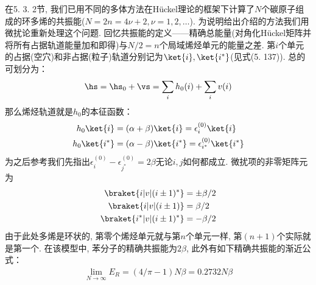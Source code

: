 在5.
3.
2节, 
我们已用不同的多体方法在H\"uckel理论的框架下计算了$N$个碳原子组成的环多烯的共振能($N=2n=4\nu +2,\nu=1,2,\ldots$). 
为说明给出介绍的方法我们用微扰论重新处理这个问题. 
回忆共振能的定义——精确总能量(对角化H\"uckel矩阵并将所有占据轨道能量加和即得)与$N/2=n$个局域烯烃单元的能量之差. 
第$i$个单元的占据(空穴)和非占据(粒子)轨道分别记为$\ket{i},\ket{i^*}$(见式(5.
137)). 
总的\ha 可划分为：
\begin{align}
\hs = \hs_0 + \vs = \sum_ih_0(i) + \sum_iv(i)
\end{align}
那么烯烃轨道就是$h_0$的本征函数：
\begin{subequations}
	\begin{align}
	h_0\ket{i} &= (\alpha+\beta)\ket{i} = \epsilon_i^{(0)}\ket{i}\\
	h_0\ket{i^*} &= (\alpha-\beta)\ket{i^*} = \epsilon_{i^*}^{(0)}\ket{i^*}
	\end{align}
\end{subequations}
为之后参考我们先指出$\epsilon_i^{(0)} - \epsilon^{(0)}_{j^*}=2\beta$无论$i,j$如何都成立. 
微扰项的非零矩阵元为
\begin{subequations}
	\begin{align}
	\braket{i|v|(i\pm 1)^*} & = \pm\beta/2\\
	\braket{i|v|(i\pm 1)} & = \beta/2\\
	\braket{i^*|v|(i\pm 1)^*} & = -\beta/2\\
	\end{align}
\end{subequations}
由于此处多烯是环状的, 
第零个烯烃单元就与第$n$个单元一样, 
第$(n+1)$个实际就是第一个. 
在该模型中, 
苯分子的精确共振能为$2\beta$, 
此外有如下精确共振能的渐近公式：
\begin{align}
\lim\limits_{N\to\infty}E_R = (4/\pi-1)N\beta=0.2732N\beta
\end{align}

